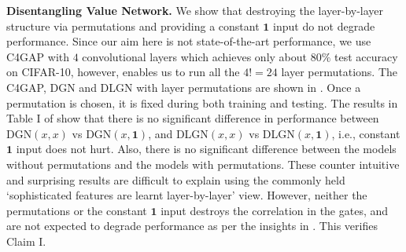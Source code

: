 \textbf{Disentangling Value Network.} We show that destroying the layer-by-layer structure via permutations and providing a constant $\mathbf{1}$ input do not degrade performance. Since our aim here is not state-of-the-art performance, we use C4GAP with $4$ convolutional layers which achieves only about $80\%$ test accuracy on CIFAR-10, however, enables us to run all the $4!=24$ layer permutations. The C4GAP, DGN and DLGN with layer permutations are shown in . Once a permutation is chosen, it is fixed during both training and testing. The results in Table I of  show that there is no significant difference in performance between DGN$(x,x)$ vs DGN$(x,\mathbf{1})$, and DLGN$(x,x)$ vs DLGN$(x,\mathbf{1})$, i.e., constant $\mathbf{1}$ input does not hurt. Also, there is no significant difference between the models without permutations and the models with permutations.  These counter intuitive and surprising results are difficult to explain using the commonly held `sophisticated features are learnt layer-by-layer' view. However, neither the permutations or the constant $\mathbf{1}$ input destroys the correlation in the gates, and are not expected to degrade performance as per the insights in . This verifies Claim I.  %
\begin{comment}
\begin{table}[!t]
\centering
\resizebox{1.0\columnwidth}{!}{
\begin{tabular}{cccccccccc}
\toprule
\multicolumn{8}{c}{Table II}\\
\toprule
Dataset 					& Model 		&DNN 				&DGN$(x,x)$ 			&DGN$(x,\mathbf{1})$ 	&DLGN$(x,x)$ 			&DLGN$(x,\mathbf{1})$ 	&$\frac{\text{DLGN}(x,\mathbf{1})}{\text{DNN}}$\\\midrule		
\multirow{2}{*}{CIFAR10}		&VGG16 		&93.6\tiny{$\pm$0.2} 	& 93.0\tiny{$\pm$0.1}  	&93.0\tiny{$\pm$0.1}   	&87.0\tiny{$\pm$0.1}		&87.0\tiny{$\pm$0.2}		&$92.94$	\\
						&ResNet110 	&94.0\tiny{$\pm$0.2} 	& 93.3\tiny{$\pm$0.2} 	&93.2\tiny{$\pm$0.1} 	&87.9\tiny{$\pm$0.2}   	&87.8\tiny{$\pm$0.1} 	&$93.40$	\\\midrule
\multirow{2}{*}{CIFAR100}		&VGG16	 	&73.4\tiny{$\pm$0.3}  	&70.3\tiny{$\pm$0.1} 	&70.5\tiny{$\pm$0.2} 	&61.5\tiny{$\pm$0.2}		&61.5\tiny{$\pm$0.1}		&$\mathbf{83.78}$	\\
						&ResNet110 	&72.7\tiny{$\pm$0.2}		&70.8\tiny{$\pm$0.2} 	&70.8\tiny{$\pm$0.4}		&62.3\tiny{$\pm$0.2} 	&62.7\tiny{$\pm$0.3} 	&$86.24$	\\
\bottomrule
\end{tabular}
}
\caption{\small{All columns (except the last) show the $\%$ test accuracy on CIFAR-10 and CIFAR-100. The results are averaged over $5$ runs. The last column shows the $\%$ of DNN performance that the DLGN recovers.}}
\label{tb:expresults}
\end{table}
\end{comment}

